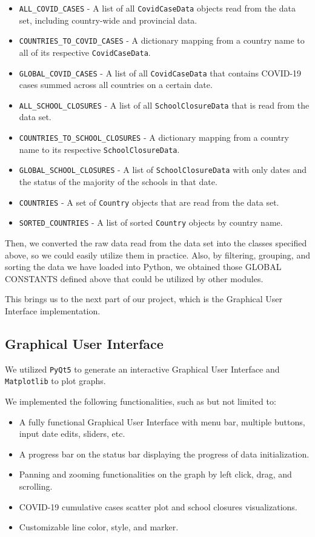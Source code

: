 \documentclass[fontsize=11pt]{article}
\begin{document}
    \begin{itemize}
        \item \verb|ALL_COVID_CASES| - A list of all \verb|CovidCaseData| objects read from the data set, including country-wide and provincial data.
        \item \verb|COUNTRIES_TO_COVID_CASES| - A dictionary mapping from a country name to all of its respective \verb|CovidCaseData|.
        \item \verb|GLOBAL_COVID_CASES| - A list of all \verb|CovidCaseData| that contains COVID-19 cases summed across all countries on a certain date.
        \item \verb|ALL_SCHOOL_CLOSURES| - A list of all \verb|SchoolClosureData| that is read from the data set.
        \item \verb|COUNTRIES_TO_SCHOOL_CLOSURES| - A dictionary mapping from a country name to its respective \verb|SchoolClosureData|.
        \item \verb|GLOBAL_SCHOOL_CLOSURES| - A list of \verb|SchoolClosureData| with only dates and the status of the majority of the schools in that date.
        \item \verb|COUNTRIES| - A set of \verb|Country| objects that are read from the data set.
        \item \verb|SORTED_COUNTRIES| - A list of sorted \verb|Country| objects by country name.
    \end{itemize}

    Then, we converted the raw data read from the data set into the classes specified above, so we could easily utilize them in practice. Also, by filtering, grouping, and sorting the data we have loaded into Python, we obtained those GLOBAL CONSTANTS defined above that could be utilized by other modules.

    This brings us to the next part of our project, which is the Graphical User Interface implementation.

    \subsection{Graphical User Interface}

    We utilized \verb|PyQt5| to generate an interactive Graphical User Interface and \verb|Matplotlib| to plot graphs.

    We implemented the following functionalities, such as but not limited to:

    \begin{itemize}
        \item A fully functional Graphical User Interface with menu bar, multiple buttons, input date edits, sliders, etc.
        \item A progress bar on the status bar displaying the progress of data initialization.
        \item Panning and zooming functionalities on the graph by left click, drag, and scrolling.
        \item COVID-19 cumulative cases scatter plot and school closures visualizations.
        \item Customizable line color, style, and marker.
    \end{itemize}
\end{document}
